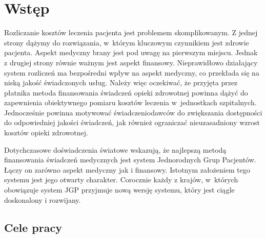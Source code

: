 \chapter{Wstęp}
\label{cha:wstep}

Rozliczanie kosztów leczenia pacjenta jest problemem skomplikowanym. Z jednej strony dążymy do rozwiązania, w~którym kluczowym czynnikiem jest zdrowie pacjenta. Aspekt medyczny brany jest pod uwagę na pierwszym miejscu. Jednak z drugiej strony równie ważnym jest aspekt finansowy. Nieprawidłowo działający system rozliczeń ma bezpośredni wpływ na aspekt medyczny, co przekłada się na niską jakość świadczonych usług\cite{kozierkiewicz_jgp}. Należy więc oczekiwać, że przyjęta przez płatnika metoda finansowania świadczeń opieki zdrowotnej powinna dążyć do zapewnienia obiektywnego pomiaru kosztów leczenia w~jednostkach szpitalnych. Jednocześnie powinna motywować świadczeniodawców do zwiększania dostępności do odpowiedniej jakości świadczeń, jak również ograniczać nieuzasadniony wzrost kosztów opieki zdrowotnej.

Dotychczasowe doświadczenia światowe wskazują, że najlepszą metodą finansowania świadczeń medycznych jest system Jednorodnych Grup Pacjentów\cite{kozierkiewicz_jgp}. Łączy on zarówno aspekt medyczny jak i finansowy. Istotnym założeniem tego systemu jest jego otwarty charakter. Corocznie każdy z krajów, w~których obowiązuje system JGP przyjmuje nową wersję systemu, który jest ciągle doskonalony i rozwijany.


\section{Cele pracy}
\label{sec:celePracy}

